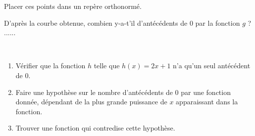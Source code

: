 \documentclass[
	classe=$1^{ere}$STI2D,
	noheader
]{exercice}
\newcommand{\computeg}[1]{
	\fpeval{#1*#1*#1 - 3*#1*#1 - #1 + 3.1}%
}
\begin{document}
{\begin{exercice}
		Placer ces points dans un repère orthonormé. \vspace{0.5em}

		D'après la courbe obtenue, combien y-a-t'il d'antécédents de $0$ par la fonction $g$ ? ......


	\end{exercice}

	\begin{exercice}\

		\begin{enumerate}
			\item Vérifier que la fonction $h$ telle que $h(x) = 2x + 1$ n'a qu'un seul antécédent de $0$.
			\item Faire une hypothèse sur le nombre d'antécédents de $0$ par une fonction donnée, dépendant de la plus grande puissance de $x$ apparaissant dans la fonction.

			\item Trouver une fonction qui contredise cette hypothèse.
		\end{enumerate}
	\end{exercice}
}

\vspace{5em}

\end{document}
